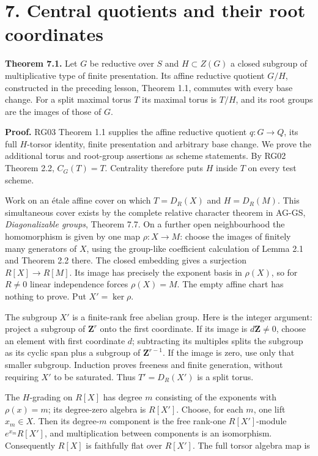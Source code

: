\documentclass[11pt,a4paper,openany]{report}
\begin{document}
\section{7. Central quotients and their root coordinates}\label{AG-RG-04-central-quotients-and-their-root-coordinates}

\textbf{Theorem 7.1.} Let \(G\) be reductive over \(S\) and \(H\subset Z(G)\) a closed subgroup of multiplicative type of finite presentation. Its affine reductive quotient \(G/H\), constructed in the preceding lesson, Theorem 1.1, commutes with every base change. For a split maximal torus \(T\) its maximal torus is \(T/H\), and its root groups are the images of those of \(G\).

\textbf{Proof.} RG03 Theorem 1.1 supplies the affine reductive quotient \(q:G\to Q\), its full \(H\)-torsor identity, finite presentation and arbitrary base change. We prove the additional torus and root-group assertions as scheme statements. By RG02 Theorem 2.2, \(C_G(T)=T\). Centrality therefore puts \(H\) inside \(T\) on every test scheme.

Work on an étale affine cover on which \(T=D_R(X)\) and \(H=D_R(M)\). This simultaneous cover exists by the complete relative character theorem in AG-GS, \emph{Diagonalizable groups}, Theorem 7.7. On a further open neighbourhood the homomorphism is given by one map \(\rho:X\to M\): choose the images of finitely many generators of \(X\), using the group-like coefficient calculation of Lemma 2.1 and Theorem 2.2 there. The closed embedding gives a surjection \(R[X]\to R[M]\). Its image has precisely the exponent basis in \(\rho(X)\), so for \(R\ne0\) linear independence forces \(\rho(X)=M\). The empty affine chart has nothing to prove. Put \(X'=\ker\rho\).

The subgroup \(X'\) is a finite-rank free abelian group. Here is the integer argument: project a subgroup of \(\mathbf Z^r\) onto the first coordinate. If its image is \(d\mathbf Z\ne0\), choose an element with first coordinate \(d\); subtracting its multiples splits the subgroup as its cyclic span plus a subgroup of \(\mathbf Z^{r-1}\). If the image is zero, use only that smaller subgroup. Induction proves freeness and finite generation, without requiring \(X'\) to be saturated. Thus \(T'=D_R(X')\) is a split torus.

The \(H\)-grading on \(R[X]\) has degree \(m\) consisting of the exponents with \(\rho(x)=m\); its degree-zero algebra is \(R[X']\). Choose, for each \(m\), one lift \(x_m\in X\). Then its degree-\(m\) component is the free rank-one \(R[X']\)-module \(e^{x_m}R[X']\), and multiplication between components is an isomorphism. Consequently \(R[X]\) is faithfully flat over \(R[X']\). The full torsor algebra map is
\end{document}
